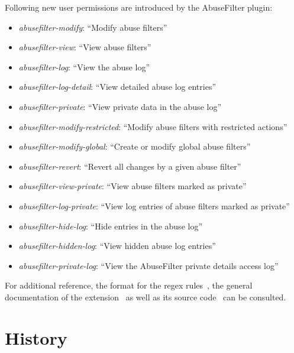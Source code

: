 Following new user permissions are introduced by the AbuseFilter plugin: %
\begin{itemize}
    \item \emph{abusefilter-modify}: ``Modify abuse filters''
    \item \emph{abusefilter-view}: ``View abuse filters''
    \item \emph{abusefilter-log}: ``View the abuse log''
    \item \emph{abusefilter-log-detail}: ``View detailed abuse log entries''
    \item \emph{abusefilter-private}: ``View private data in the abuse log''
    \item \emph{abusefilter-modify-restricted}: ``Modify abuse filters with restricted actions''
    \item \emph{abusefilter-modify-global}: ``Create or modify global abuse filters''
    \item \emph{abusefilter-revert}: ``Revert all changes by a given abuse filter''
    \item \emph{abusefilter-view-private}: ``View abuse filters marked as private''
    \item \emph{abusefilter-log-private}: ``View log entries of abuse filters marked as private''
    \item \emph{abusefilter-hide-log}: ``Hide entries in the abuse log''
    \item \emph{abusefilter-hidden-log}: ``View hidden abuse log entries''
    \item \emph{abusefilter-private-log}: ``View the AbuseFilter private details access log''
\end{itemize}

For additional reference, the format for the regex rules~\cite{Mediawiki:AbuseFilterRules}, the general documentation of the extension~\cite{Mediawiki:AbuseFilterExtension} as well as its source code~\cite{gerrit-abusefilter-source} can be consulted.



\section{History}

